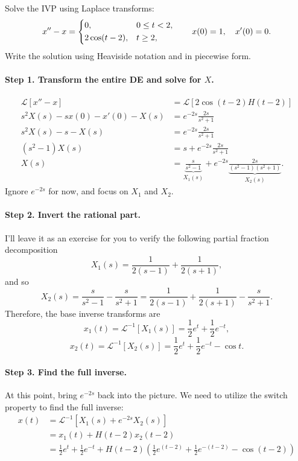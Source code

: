 \documentclass[10pt,letterpaper]{article}
\begin{document}
\begin{example}[3]{
Solve the IVP using Laplace transforms:
\[
x''-x=
\begin{dcases}
0, & 0\le t<2,\\
2\cos(t-2), & t\ge2,
\end{dcases}
\qquad x(0)=1,\quad x'(0)=0.
\]
Write the solution using Heaviside notation and in
piecewise form.
}

\paragraph{Step 1. Transform the entire DE and solve for $X$.}
\begin{align*}
   \mathcal{L}\left[  x''-x \right] &= \mathcal{L}\left[2\cos(t-2)H(t-2)\right] \\
s^2X(s)-sx(0)-x'(0)-X(s) &=e^{-2s}\frac{2s}{s^2+1}\\
s^2X(s)-s-X(s)&=e^{-2s}\frac{2s}{s^2+1}\\
(s^2-1)X(s)&=s+e^{-2s}\frac{2s}{s^2+1}\\
X(s)&=
\underbrace{\frac{s}{s^2-1}}_{X_1(s)}
+
e^{-2s}
\underbrace{\frac{2s}{(s^2-1)(s^2+1)}}_{X_2(s)}.
\end{align*}
Ignore $e^{-2s}$ for now, and focus on $X_1$ and $X_2$.

\paragraph{Step 2. Invert the rational part.}
I'll leave it as an exercise for you to verify the following partial fraction decomposition
\[
X_1(s)=\frac{1}{2(s-1)}+\frac{1}{2(s+1)},
\]
and so
\[
X_2(s)=\frac{s}{s^2-1}-\frac{s}{s^2+1}
=\frac{1}{2(s-1)}+\frac{1}{2(s+1)}
-\frac{s}{s^2+1}.
\]
Therefore, the base inverse transforms are 
\[
x_1(t)=\mathcal L^{-1}[X_1(s)]
=\frac12e^t+\frac12e^{-t},
\]
\[
x_2(t)=\mathcal L^{-1}[X_2(s)]
=\frac12e^t+\frac12e^{-t}-\cos t.
\]
\paragraph{Step 3. Find the full inverse.}
At this point, bring $e^{-2s}$ back into the picture. We need to utilize the switch property to find the full inverse:
\begin{align*}
    x(t)&=\mathcal{L}^{-1}\left[ X_1(s) +e^{-2s}X_2(s)\right]\\
        &=x_1(t) + H(t-2)x_2(t-2)\\
        &=\boxed{
        \frac12e^t+\frac12e^{-t}+H(t-2)\left(\frac12e^{(t-2)}+\frac12e^{-(t-2)}-\cos (t-2)\right)}
\end{align*}


\end{example}
\end{document}
